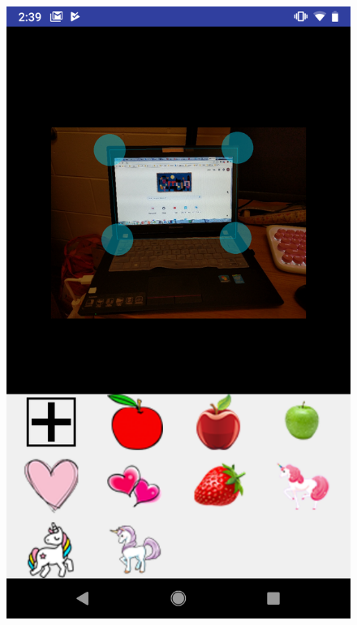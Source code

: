 \begin{figure}[H]
\begin{minipage}[H]{0.3\textwidth}
\includegraphics[width=.95\textwidth]{section04/assets/GiftThransformExample.png}
\subcaption{\label{GiftThransformExample}}
\end{minipage}%
\begin{minipage}[H]{0.3\textwidth}

\end{minipage}
\end{figure}

